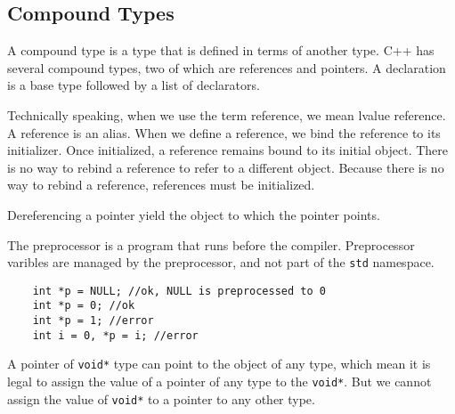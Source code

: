 \documentclass[11pt]{ctexart}
\begin{document}
\subsection{Compound Types}
A compound type is a type that is defined in terms of another type. C++ has several compound types, two of which are references and pointers. A declaration is a base type followed by a list of declarators.\par
Technically speaking, when we use the term reference, we mean lvalue reference. A reference is an alias. When we define a reference, we bind the reference to its initializer. Once initialized, a reference remains bound to its initial object. There is no way to rebind a reference to refer to a different object. Because there is no way to rebind a reference, references must be initialized.\par
Dereferencing a pointer yield the object to which the pointer points.\par
The preprocessor is a program that runs before the compiler. Preprocessor varibles are managed by the preprocessor, and not part of the \verb|std|  namespace.\begin{lstlisting}
    int *p = NULL; //ok, NULL is preprocessed to 0
    int *p = 0; //ok
    int *p = 1; //error
    int i = 0, *p = i; //error
\end{lstlisting}
A pointer of \verb|void*| type can point to the object of any type, which mean it is legal to assign the value of a pointer of any type to the \verb|void*|. But we cannot assign the value of \verb|void*| to a pointer to any other type.
\end{document}
